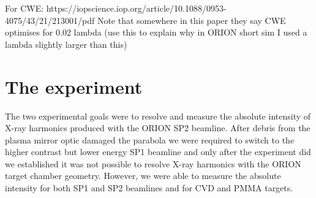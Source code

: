For CWE: https://iopscience.iop.org/article/10.1088/0953-4075/43/21/213001/pdf
Note that somewhere in this paper they say CWE optimises for 0.02 lambda (use this to explain why in ORION short sim I used a lambda slightly larger than this)


\section{The experiment}
The two experimental goals were to resolve and measure the absolute intensity of X-ray harmonics produced with the ORION SP2 beamline. After debris from the plasma mirror optic damaged the parabola we were required to switch to the higher contrast but lower energy SP1 beamline and only after the experiment did we established it was not possible to resolve X-ray harmonics with the ORION target chamber geometry. However, we were able to measure the absolute intensity for both SP1 and SP2 beamlines and for CVD and PMMA targets.

